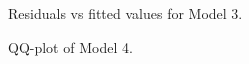 \documentclass[review,12pt,authoryear]{elsarticle}
\begin{document}
\begin{linenumbers}
\begin{figure}
  \caption{Residuals vs fitted values for Model 3.}
\end{figure}

\begin{figure}
  \caption{QQ-plot of Model 4.}
\end{figure}


\end{linenumbers}
\end{document}
